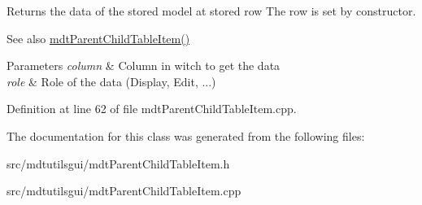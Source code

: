 Returns the data of the stored model at stored row The row is set by constructor. 

\begin{DoxySeeAlso}{See also}
\hyperlink{classmdt_parent_child_table_item_ad1a5c00ca1d0367d631548fa5732d41c}{mdtParentChildTableItem()} 
\end{DoxySeeAlso}

\begin{DoxyParams}{Parameters}
{\em column} & Column in witch to get the data \\
\hline
{\em role} & Role of the data (Display, Edit, ...) \\
\hline
\end{DoxyParams}


Definition at line 62 of file mdtParentChildTableItem.cpp.



The documentation for this class was generated from the following files:\begin{DoxyCompactItemize}
\item 
src/mdtutilsgui/mdtParentChildTableItem.h\item 
src/mdtutilsgui/mdtParentChildTableItem.cpp\end{DoxyCompactItemize}

